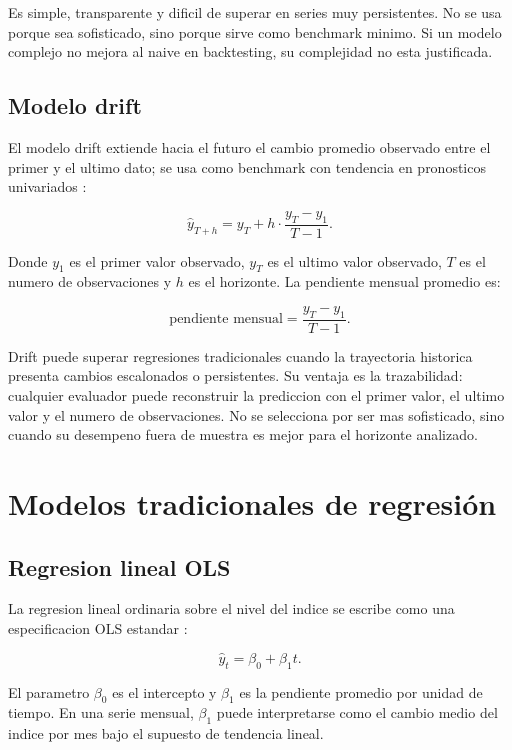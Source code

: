 ﻿\documentclass[12pt,letterpaper]{article}
\newcommand{\yhat}{\hat{y}}
\begin{document}
Es simple, transparente y dificil de superar en series muy persistentes. No se usa porque sea sofisticado, sino porque sirve como benchmark minimo. Si un modelo complejo no mejora al naive en backtesting, su complejidad no esta justificada.



\subsection{Modelo drift}

El modelo drift extiende hacia el futuro el cambio promedio observado entre el primer y el ultimo dato; se usa como benchmark con tendencia en pronosticos univariados \citep{hyndman2021fpp3}:

\[
\yhat_{T+h}=y_T+h\cdot\frac{y_T-y_1}{T-1}.
\]

Donde \(y_1\) es el primer valor observado, \(y_T\) es el ultimo valor observado, \(T\) es el numero de observaciones y \(h\) es el horizonte. La pendiente mensual promedio es:

\[
\text{pendiente mensual}=\frac{y_T-y_1}{T-1}.
\]

Drift puede superar regresiones tradicionales cuando la trayectoria historica presenta cambios escalonados o persistentes. Su ventaja es la trazabilidad: cualquier evaluador puede reconstruir la prediccion con el primer valor, el ultimo valor y el numero de observaciones. No se selecciona por ser mas sofisticado, sino cuando su desempeno fuera de muestra es mejor para el horizonte analizado.



\section{Modelos tradicionales de regresión}

\subsection{Regresion lineal OLS}

La regresion lineal ordinaria sobre el nivel del indice se escribe como una especificacion OLS estandar \citep{penn_state_stat501}:

\[
\yhat_t=\beta_0+\beta_1 t.
\]

El parametro \(\beta_0\) es el intercepto y \(\beta_1\) es la pendiente promedio por unidad de tiempo. En una serie mensual, \(\beta_1\) puede interpretarse como el cambio medio del indice por mes bajo el supuesto de tendencia lineal.
\end{document}

